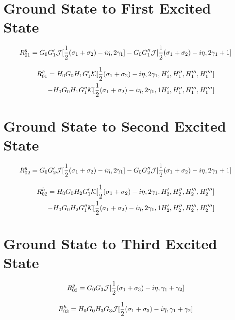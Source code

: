 \section{Ground State to First Excited State}
\begin{equation}
R^g_{01} = G_0 G'_1 \mathcal{J}[\frac{1}{2}(\sigma_1 + \sigma_2) - i\eta,2\gamma_1] -
           G_0 G''_1 \mathcal{J}[\frac{1}{2}(\sigma_1 + \sigma_2) - i\eta,2\gamma_1 + 1]
\end{equation}

\begin{equation}
\begin{split}
R^h_{01} = H_0 G_0 H_1 
            G'_1 \mathcal{K}[\frac{1}{2}(\sigma_1 + \sigma_2) - i\eta, 2\gamma_1,H'_1,H''_1,H'''_1,H''''_1]
            \\ -
   H_0 G_0 H_1          G''_1 \mathcal{K}[\frac{1}{2}(\sigma_1 + \sigma_2) - i\eta, 2\gamma_1,  1H'_1,H''_1,H'''_1,H''''_1]
\end{split}
\end{equation}

\section{Ground State to Second Excited State}
\begin{equation}
R^g_{02} = G_0 G'_2 \mathcal{J}[\frac{1}{2}(\sigma_1 + \sigma_2) - i\eta,2\gamma_1] -
           G_0 G''_2 \mathcal{J}[\frac{1}{2}(\sigma_1 + \sigma_2) - i\eta,2\gamma_1 + 1]
\end{equation}

\begin{equation}
\begin{split}
R^h_{02} = H_0 G_0 H_2 
            G'_1 \mathcal{K}[\frac{1}{2}(\sigma_1 + \sigma_2) - i\eta, 2\gamma_1,H'_2,H''_2,H'''_2,H''''_2]
            \\ - 
   H_0 G_0 H_2          G''_1 \mathcal{K}[\frac{1}{2}(\sigma_1 + \sigma_2) - i\eta, 2\gamma_1, 1H'_2,H''_2,H'''_2,H''''_2]
\end{split}
\end{equation}

\section{Ground State to Third Excited State}
\begin{equation}
R^g_{03} = G_0 G_3 \mathcal{J}[\frac{1}{2}(\sigma_1 + \sigma_3) - i\eta, \gamma_1 + \gamma_2]
\end{equation}

\begin{equation}
R^h_{03} = H_0 G_0 H_3 G_3 \mathcal{J}[\frac{1}{2}(\sigma_1 + \sigma_3) - i\eta, \gamma_1 + \gamma_2]
\end{equation}


